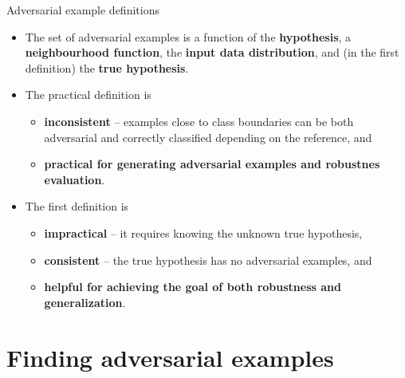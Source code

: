 \documentclass{beamer}
\begin{document}
\begin{frame}[allowframebreaks=0.9]{Adversarial example definitions}
\begin{itemize}
	\item The set of adversarial examples is a function of the \textbf{hypothesis}, a \textbf{neighbourhood function}, the \textbf{input data distribution}, and (in the first definition) the \textbf{true hypothesis}. 
	\item The practical definition is
	\begin{itemize}
		\item \textbf{inconsistent} -- examples close to class boundaries can be both adversarial and correctly classified depending on the reference, and 
		\item \textbf{practical for generating adversarial examples and robustnes evaluation}.
	\end{itemize}
	\item The first definition is 
	\begin{itemize}
		\item \textbf{impractical} -- it requires knowing the unknown true hypothesis,
		\item \textbf{consistent} -- the true hypothesis has no adversarial examples, and 
		\item \textbf{helpful for achieving the goal of both robustness and generalization}.
	\end{itemize}
\end{itemize}
\end{frame}

\section{Finding adversarial examples}
\end{document}
